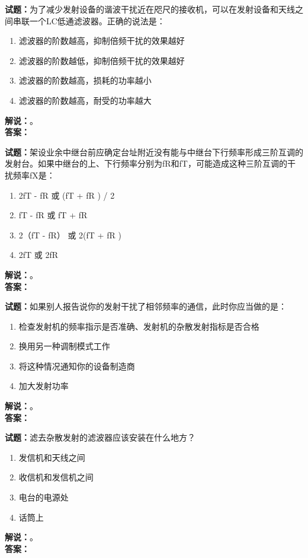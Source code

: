 \documentclass{ctexbook}
\begin{document}
\bigskip




\noindent\textbf{试题：}为了减少发射设备的谐波干扰近在咫尺的接收机，可以在发射设备和天线之间串联一个LC低通滤波器。正确的说法是：
\begin{enumerate}[leftmargin=3em]
\item 滤波器的阶数越高，抑制倍频干扰的效果越好
\item 滤波器的阶数越低，抑制倍频干扰的效果越好
\item 滤波器的阶数越高，损耗的功率越小
\item 滤波器的阶数越高，耐受的功率越大
\end{enumerate}
\noindent\textbf{解说：}\textbf{}。\\\noindent\textbf{答案：}

\bigskip




\noindent\textbf{试题：}架设业余中继台前应确定台址附近没有能与中继台下行频率形成三阶互调的发射台。如果中继台的上、下行频率分别为fR和fT，可能造成这种三阶互调的干扰频率fX是：
\begin{enumerate}[leftmargin=3em]
\item 2fT - fR 或 (fT + fR ) / 2
\item fT - fR 或 fT + fR
\item 2（fT - fR） 或 2(fT + fR )
\item 2fT 或 2fR
\end{enumerate}
\noindent\textbf{解说：}\textbf{}。\\\noindent\textbf{答案：}

\bigskip




\noindent\textbf{试题：}如果别人报告说你的发射干扰了相邻频率的通信，此时你应当做的是：
\begin{enumerate}[leftmargin=3em]
\item 检查发射机的频率指示是否准确、发射机的杂散发射指标是否合格
\item 换用另一种调制模式工作
\item 将这种情况通知你的设备制造商
\item 加大发射功率
\end{enumerate}
\noindent\textbf{解说：}\textbf{}。\\\noindent\textbf{答案：}

\bigskip




\noindent\textbf{试题：}滤去杂散发射的滤波器应该安装在什么地方？
\begin{enumerate}[leftmargin=3em]
\item 发信机和天线之间
\item 收信机和发信机之间
\item 电台的电源处
\item 话筒上
\end{enumerate}
\noindent\textbf{解说：}\textbf{}。\\\noindent\textbf{答案：}
\end{document}

